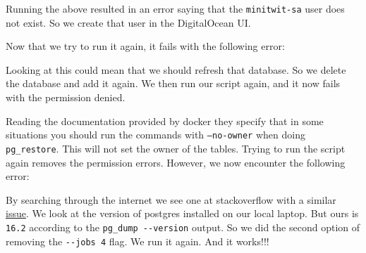Running the above resulted in an error saying that the \texttt{minitwit-sa} user does not exist. So we create that user in the DigitalOcean UI.

Now that we try to run it again, it fails with the following error:

\begin{Shaded}
\begin{Highlighting}[]
\ErrorTok{(}
\KeywordTok{);}

\KeywordTok{;}

\ErrorTok{(}
\KeywordTok{);}
\end{Highlighting}
\end{Shaded}

Looking at this could mean that we should refresh that database. So we delete the database and add it again. We then run our script again, and it now fails with the permission denied.

Reading the documentation provided by docker they specify that in some situations you should run the commands with \texttt{—no-owner} when doing \texttt{pg\_restore}. This will not set the owner of the tables. Trying to run the script again removes the permission errors. However, we now encounter the following error:

\begin{Shaded}
\begin{Highlighting}[]
\end{Highlighting}
\end{Shaded}

By searching through the internet we see one at stackoverflow with a similar \href{https://dba.stackexchange.com/questions/257398/pg-restore-with-jobs-flag-results-in-pg-restore-error-a-worker-process-di}{issue}. We look at the version of postgres installed on our local laptop. But ours is \texttt{16.2} according to the \texttt{pg\_dump\ -\/-version} output. So we did the second option of removing the \texttt{-\/-jobs\ 4} flag. We run it again. And it works!!!

